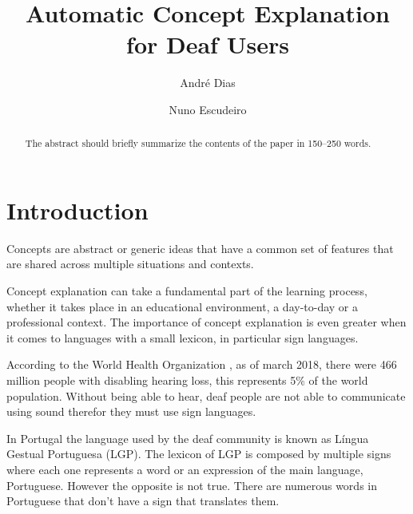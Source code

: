 \documentclass[runningheads]{llncs}
\begin{document}
%
\title{Automatic Concept Explanation for Deaf Users}
%
%
\author{André Dias \and
Nuno Escudeiro}
%
%
%
\maketitle              %
%
\begin{abstract}
    The abstract should briefly summarize the contents of the paper in
    150--250 words.

\end{abstract}
%
%
%
\section{Introduction}

Concepts are abstract or generic ideas that have a common set of features that are shared across multiple situations and contexts.

Concept explanation can take a fundamental part of the learning process, whether it takes place in an educational environment, a day-to-day or a professional context.
The importance of concept explanation is even greater when it comes to languages with a small lexicon, in particular sign languages.

According to the World Health Organization \cite{who_2020}, as of march 2018, there were 466 million people with disabling hearing loss, this represents 5\% of the world population.
Without being able to hear, deaf people are not able to communicate using sound therefor they must use sign languages.

In Portugal the language used by the deaf community is known as Língua Gestual Portuguesa (LGP).
The lexicon of LGP is composed by multiple signs where each one represents a word or an expression of the main language, Portuguese.
However the opposite is not true.
There are numerous words in Portuguese that don't have a sign that translates them.
\end{document}
